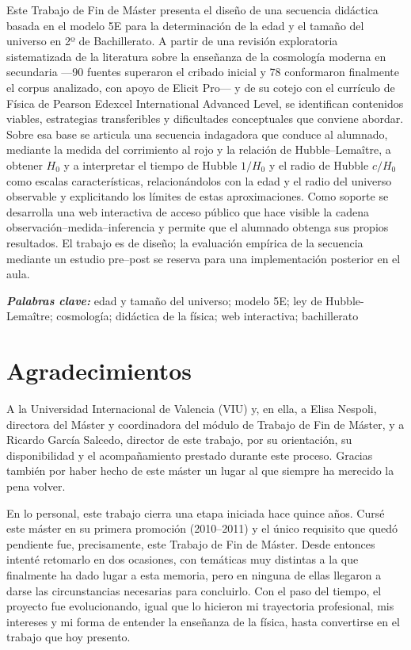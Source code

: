 \documentclass[10pt,a4paper]{report}
\providecommand{\keywords}[1]
{
  \small
  \textbf{\textit{Palabras clave:\hspace{0.3cm}}} #1
}
\begin{document}
Este Trabajo de Fin de Máster presenta el diseño de una secuencia didáctica basada en el modelo 5E para la determinación de la edad y el tamaño del universo en 2º de Bachillerato. A partir de una revisión exploratoria sistematizada de la literatura sobre la enseñanza de la cosmología moderna en secundaria ---90 fuentes superaron el cribado inicial y 78 conformaron finalmente el corpus analizado, con apoyo de Elicit Pro--- y de su cotejo con el currículo de Física de Pearson Edexcel International Advanced Level, se identifican contenidos viables, estrategias transferibles y dificultades conceptuales que conviene abordar. Sobre esa base se articula una secuencia indagadora que conduce al alumnado, mediante la medida del corrimiento al rojo y la relación de Hubble--Lemaître, a obtener $H_{0}$ y a interpretar el tiempo de Hubble $1/H_{0}$ y el radio de Hubble $c/H_{0}$ como escalas características, relacionándolos con la edad y el radio del universo observable y explicitando los límites de estas aproximaciones. Como soporte se desarrolla una web interactiva de acceso público que hace visible la cadena observación--medida--inferencia y permite que el alumnado obtenga sus propios resultados. El trabajo es de diseño; la evaluación empírica de la secuencia mediante un estudio pre--post se reserva para una implementación posterior en el aula.

\vspace{0.5cm}
\keywords{edad y tamaño del universo; modelo 5E; ley de Hubble-Lemaître; cosmología; didáctica de la física; web interactiva; bachillerato}

\newpage
\section*{Agradecimientos}\label{sec:agradecimientos}
A la Universidad Internacional de Valencia (VIU) y, en ella, a Elisa Nespoli, directora del Máster y coordinadora del módulo de Trabajo de Fin de Máster, y a Ricardo García Salcedo, director de este trabajo, por su orientación, su disponibilidad y el acompañamiento prestado durante este proceso. Gracias también por haber hecho de este máster un lugar al que siempre ha merecido la pena volver.

En lo personal, este trabajo cierra una etapa iniciada hace quince años. Cursé este máster en su primera promoción (2010--2011) y el único requisito que quedó pendiente fue, precisamente, este Trabajo de Fin de Máster. Desde entonces intenté retomarlo en dos ocasiones, con temáticas muy distintas a la que finalmente ha dado lugar a esta memoria, pero en ninguna de ellas llegaron a darse las circunstancias necesarias para concluirlo. Con el paso del tiempo, el proyecto fue evolucionando, igual que lo hicieron mi trayectoria profesional, mis intereses y mi forma de entender la enseñanza de la física, hasta convertirse en el trabajo que hoy presento.
\end{document}
